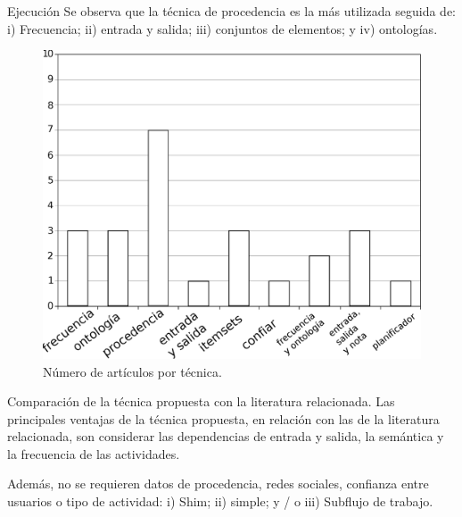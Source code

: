 \begin{frame}		
	\begin{block}{Ejecución}
		Se observa que la técnica de procedencia es la más utilizada seguida de: i) Frecuencia; ii) entrada y salida; iii) conjuntos de elementos; y iv) ontologías.
		\begin{figure}
			\begin{minipage}[b]{0.6\textwidth}
				\includegraphics[width=\textwidth]{./secoes/RevisaoDaLiteratura/GraficoQuantidadeTecnica.eps}
				\caption{Número de artículos por técnica.}
			\end{minipage}
		\end{figure}
		
	\end{block}
\end{frame}

\begin{frame}		
	\begin{block}{Comparación de la técnica propuesta con la literatura relacionada.}
		Las principales ventajas de la técnica propuesta, en relación con las de la literatura relacionada, son considerar las dependencias de entrada y salida, la semántica y la frecuencia de las actividades. 
		
		Además, no se requieren datos de procedencia, redes sociales, confianza entre usuarios o tipo de actividad: i) Shim; ii) simple; y / o iii) Subflujo de trabajo.
	\end{block}
\end{frame}

